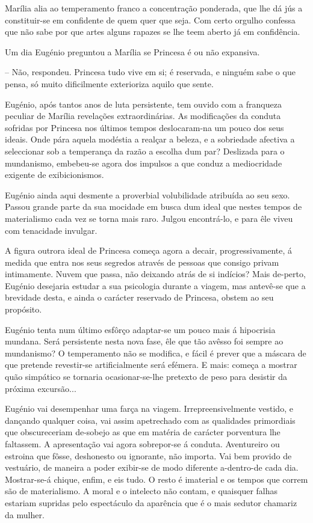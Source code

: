 \documentclass[9pt]{article}
\begin{document}
Marília alia ao temperamento franco a concentra\-ção ponderada, que lhe
dá jús a constituir-se em confidente de quem quer que seja. Com certo
orgu\-lho confessa que não sabe por que artes alguns rapazes se lhe teem
aberto já em confidên\-cia.

Um dia Eugé\-nio preguntou a Marília se Princesa é ou não expansiva.

-- Não, respondeu. Princesa tudo vive em si; é reservada, e nin\-guém
sabe o que pensa, só muito dificilmente exterioriza aquilo que sente.

Eugé\-nio, após tantos anos de luta persistente, tem ouvido com a franqueza peculiar de Marília revela\-ções extraordinárias. As modifi\-ca\-ções
da conduta sofridas por Princesa nos últimos tempos desloca\-\mbox{ram-na}
um pouco dos seus ideais. Onde pára aquela modéstia a realçar a beleza,
e a sobriedade afectiva a seleccionar sob a temperan\-ça da razão a esco\-lha dum par? Deslizada para o mundanismo, embebeu-se agora dos impulsos
a que conduz a mediocridade exigente de exibicionismos.

Eugé\-nio ainda aqui desmente a proverbial volubilidade atribuída ao
seu sexo. Passou gran\-de parte da sua mocidade em busca dum ideal que nestes tempos de materialismo cada vez se torna mais raro. Julgou encontrá-lo, e para êle viveu com tenacidade invulgar.

A figura outrora ideal de Princesa começa agora a decair, progressivamente, á medida que entra nos seus segredos através de pessoas que
consigo privam intimamente. Nuvem que passa, não deixando atrás de si indícios? Mais de-perto, Eugé\-nio desejaria estudar a sua psicologia durante a viagem, mas antevê-se que a brevidade desta, e ainda o carácter reservado de Princesa, obstem ao seu propósito.

Eugé\-nio tenta num último esfôrço adaptar-se um pouco mais á hipocrisia mundana. Será persistente nesta nova fase, êle que tão avêsso foi
sempre ao mundanismo? O temperamento não se modifi\-ca, e fácil é prever
que a máscara de que pretende revestir-se artificialmente será efémera.
E mais: começa a mostrar quão simpático se tornaria ocasio\-nar-se-lhe
pretexto de peso para desistir da próxima excursão...

Eugé\-nio vai desempenhar uma farça na viagem. Irrepreensivelmente
vestido, e dan\-çando qualquer coisa, vai assim apetrechado com as qualidades
primordiais que obscureceriam de-sobejo as que em ma\-té\-ria de carácter
porventura lhe faltassem. A apresenta\-ção vai agora sobrepor-se á conduta.
Aventureiro ou estroina que fôsse, deshonesto ou ignorante, não importa. Vai
bem provido de vestuário, de maneira a poder exibir-se de modo diferente
a-dentro-de cada dia. Mostrar-se-á chique, enfim, e eis tudo. O resto é
imaterial e os tempos que correm são de materialismo. A moral e o intelecto não contam, e quaisquer fa\-lhas estariam supridas pelo espectáculo
da aparência que é o mais sedutor chamariz da mu\-lher.
\end{document}
